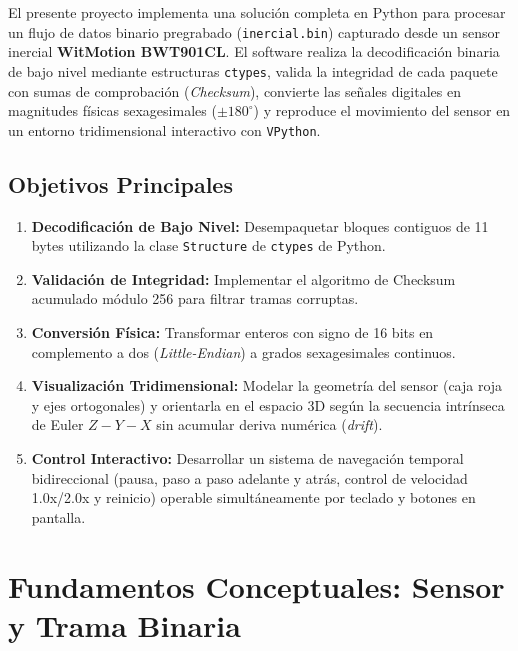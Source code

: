 \documentclass[12pt,letterpaper]{article}
\begin{document}
El presente proyecto implementa una solución completa en Python para procesar un flujo de datos binario pregrabado (\texttt{inercial.bin}) capturado desde un sensor inercial \textbf{WitMotion BWT901CL}. El software realiza la decodificación binaria de bajo nivel mediante estructuras \texttt{ctypes}, valida la integridad de cada paquete con sumas de comprobación (\textit{Checksum}), convierte las señales digitales en magnitudes físicas sexagesimales ($\pm 180^\circ$) y reproduce el movimiento del sensor en un entorno tridimensional interactivo con \texttt{VPython}.

\subsection{Objetivos Principales}
\begin{enumerate}
    \item \textbf{Decodificación de Bajo Nivel:} Desempaquetar bloques contiguos de 11 bytes utilizando la clase \texttt{Structure} de \texttt{ctypes} de Python.
    \item \textbf{Validación de Integridad:} Implementar el algoritmo de Checksum acumulado módulo 256 para filtrar tramas corruptas.
    \item \textbf{Conversión Física:} Transformar enteros con signo de 16 bits en complemento a dos (\textit{Little-Endian}) a grados sexagesimales continuos.
    \item \textbf{Visualización Tridimensional:} Modelar la geometría del sensor (caja roja y ejes ortogonales) y orientarla en el espacio 3D según la secuencia intrínseca de Euler $Z-Y-X$ sin acumular deriva numérica (\textit{drift}).
    \item \textbf{Control Interactivo:} Desarrollar un sistema de navegación temporal bidireccional (pausa, paso a paso adelante y atrás, control de velocidad 1.0x/2.0x y reinicio) operable simultáneamente por teclado y botones en pantalla.
\end{enumerate}

\section{Fundamentos Conceptuales: Sensor y Trama Binaria}
\end{document}
